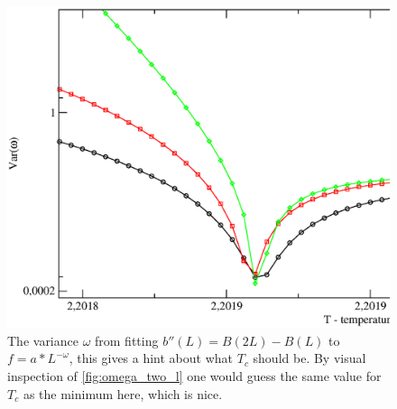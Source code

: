 \begin{figure}[!htpb]
  \centering
  \includegraphics[width=\textwidth]{./plots/3DXY/vsT/variace_omega.eps}
  \caption{The variance $\omega$ from fitting $b''(L) = B(2L)-B(L)$ to $f = a*L^{-\omega}$, this gives a hint about what $T_c$ should be. By visual inspection of \ref{fig:omega_two_l} one would guess the same value for $T_c$ as the minimum here, which is nice. }
\end{figure}
